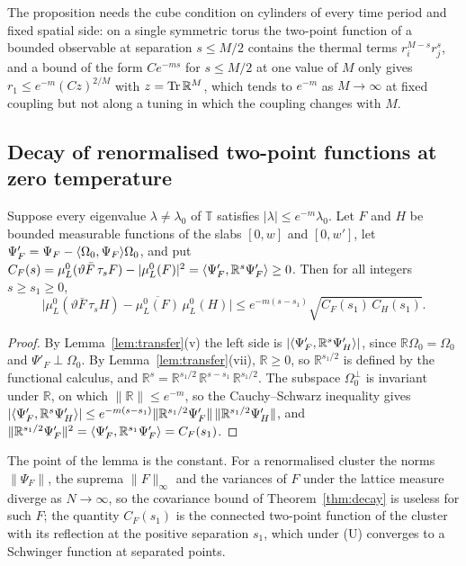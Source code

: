 The proposition needs the cube condition on cylinders of every time period
and fixed spatial side: on a single symmetric torus the two-point function
of a bounded observable at separation $s\le M/2$ contains the thermal terms
$r_i^{M-s}r_j^{s}$, and a bound of the form $Ce^{-ms}$ for $s\le M/2$ at one
value of $M$ only gives $r_1\le e^{-m}(Cz)^{2/M}$ with $z=\operatorname{Tr}\mathbb R^M$, which tends to $e^{-m}$
as $M\to\infty$ at fixed coupling but not along a tuning in which the
coupling changes with $M$.

\subsection{Decay of renormalised two-point functions at zero temperature}
\label{ssec:zerotemp}

\begin{lemma}\label{lem:gaptodecay}
Suppose every eigenvalue $\lambda\ne\lambda_0$ of $\mathbb T$ satisfies $|\lambda|
\le e^{-m}\lambda_0$. Let $F$ and $H$ be bounded measurable functions of the
slabs $[0,w]$ and $[0,w']$, let $\Psi'_F=\Psi_F-\langle \Omega_0,\Psi_F\rangle\Omega_0$,
and put $C_F(s)=\mu^0_L(\vartheta\bar F\,\tau_sF)-|\mu^0_L(F)|^2=
\langle \Psi'_F,\mathbb R^s\Psi'_F\rangle\ge0$. Then for all integers $s\ge s_1\ge0$,
\[
\bigl|\mu^0_L(\vartheta\bar F\,\tau_sH)-\overline{\mu^0_L(F)}\,\mu^0_L(H)\bigr|
\le e^{-m(s-s_1)}\sqrt{C_F(s_1)\,C_H(s_1)} .
\]
\end{lemma}

\begin{proof}
By Lemma~\ref{lem:transfer}(v) the left side is $|\langle \Psi'_F,\mathbb R^s
\Psi'_H\rangle|$, since $\mathbb R\Omega_0=\Omega_0$ and $\Psi'_F\perp\Omega_0$. By
Lemma~\ref{lem:transfer}(vii), $\mathbb R\ge0$, so $\mathbb R^{s_1/2}$ is
defined by the functional calculus, and $\mathbb R^{s}=\mathbb R^{s_1/2}\,
\mathbb R^{s-s_1}\,\mathbb R^{s_1/2}$. The subspace $\Omega_0^\perp$ is
invariant under $\mathbb R$, on which $\|\mathbb R\|\le e^{-m}$, so the
Cauchy--Schwarz inequality gives $|\langle \Psi'_F,\mathbb R^s\Psi'_H\rangle|\le
e^{-m(s-s_1)}\|\mathbb R^{s_1/2}\Psi'_F\|\,\|\mathbb R^{s_1/2}\Psi'_H\|$, and
$\|\mathbb R^{s_1/2}\Psi'_F\|^2=\langle \Psi'_F,\mathbb R^{s_1}\Psi'_F\rangle=C_F(s_1)$.
\end{proof}

The point of the lemma is the constant. For a renormalised cluster the
norms $\|\Psi_F\|$, the suprema $\|F\|_\infty$ and the variances of $F$ under
the lattice measure diverge as $N\to\infty$, so the covariance bound of
Theorem~\ref{thm:decay} is useless for such $F$; the quantity $C_F(s_1)$ is
the connected two-point function of the cluster with its reflection at the
positive separation $s_1$, which under (U) converges to a Schwinger function
at separated points.

